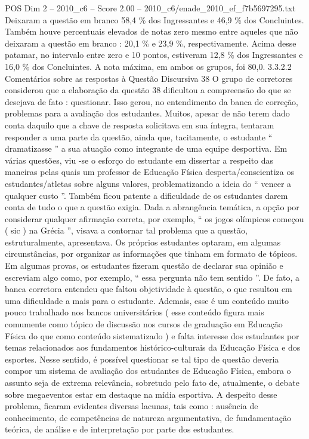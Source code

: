 \begin{textsample}{POS Dim 2 – 2010\_c6 – Score 2.00 – 2010\_c6/enade\_2010\_ef\_f7b5697295.txt}
Deixaram a questão em branco 58,4 \% dos Ingressantes e 46,9 \% dos Concluintes.
Também houve percentuais elevados de notas zero mesmo entre aqueles que não deixaram a questão em branco : 20,1 \% e 23,9 \%, respectivamente.
Acima desse patamar, no intervalo entre zero e 10 pontos, estiveram 12,8 \% dos Ingressantes e 16,0 \% dos Concluintes.
A nota máxima, em ambos os grupos, foi 80,0. 3.3.2.2 Comentários sobre as respostas à Questão Discursiva 38 O grupo de corretores considerou que a elaboração da questão 38 dificultou a compreensão do que se desejava de fato : questionar.
Isso gerou, no entendimento da banca de correção, problemas para a avaliação dos estudantes.
Muitos, apesar de não terem dado conta daquilo que a chave de resposta solicitava em sua íntegra, tentaram responder a uma parte da questão, ainda que, tacitamente, o estudante “ dramatizasse ” a sua atuação como integrante de uma equipe desportiva.
Em várias questões, viu -se o esforço do estudante em dissertar a respeito das maneiras pelas quais um professor de Educação Física desperta/conscientiza os estudantes/atletas sobre alguns valores, problematizando a ideia do “ vencer a qualquer custo ”.
Também ficou patente a dificuldade de os estudantes darem conta de tudo o que a questão exigia.
Dada a abrangência temática, a opção por considerar qualquer afirmação correta, por exemplo, “ os jogos olímpicos começou ( sic ) na Grécia ”, visava a contornar tal problema que a questão, estruturalmente, apresentava.
Os próprios estudantes optaram, em algumas circunstâncias, por organizar as informações que tinham em formato de tópicos.
Em algumas provas, os estudantes fizeram questão de declarar sua opinião e escreviam algo como, por exemplo, “ essa pergunta não tem sentido ”.
De fato, a banca corretora entendeu que faltou objetividade à questão, o que resultou em uma dificuldade a mais para o estudante.
Ademais, esse é um conteúdo muito pouco trabalhado nos bancos universitários ( esse conteúdo figura mais comumente como tópico de discussão nos cursos de graduação em Educação Física do que como conteúdo sistematizado ) e falta interesse dos estudantes por temas relacionados aos fundamentos histórico-culturais da Educação Física e dos esportes.
Nesse sentido, é possível questionar se tal tipo de questão deveria compor um sistema de avaliação dos estudantes de Educação Física, embora o assunto seja de extrema relevância, sobretudo pelo fato de, atualmente, o debate sobre megaeventos estar em destaque na mídia esportiva.
A despeito desse problema, ficaram evidentes diversas lacunas, tais como : ausência de conhecimento, de competências de natureza argumentativa, de fundamentação teórica, de análise e de interpretação por parte dos estudantes.

\end{textsample}
